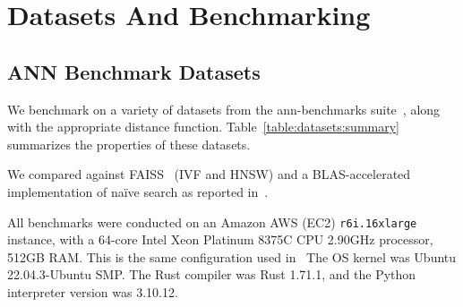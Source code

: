 
\section{Datasets And Benchmarking}
\label{sec:datasets-and-benchmarks}

\subsection{ANN Benchmark Datasets}
\label{subsec:ann-benchmarks}


We benchmark on a variety of datasets from the ann-benchmarks suite~\cite{Aumller2018ANNBenchmarksAB}, along with the appropriate distance function.
Table~\ref{table:datasets:summary} summarizes the properties of these datasets.

We compared against FAISS~\cite{johnson2019billion} (IVF and HNSW) and a BLAS-accelerated implementation of na\"ive search as reported in~\cite{johnson2019billion}.

All benchmarks were conducted on an Amazon AWS (EC2) \texttt{r6i.16xlarge} instance, with a 64-core Intel Xeon Platinum 8375C CPU 2.90GHz processor, 512GB RAM.
This is the same configuration used in~\cite{Aumller2018ANNBenchmarksAB}
The OS kernel was Ubuntu 22.04.3-Ubuntu SMP. 
The Rust compiler was Rust 1.71.1, and the Python interpreter version was 3.10.12.

